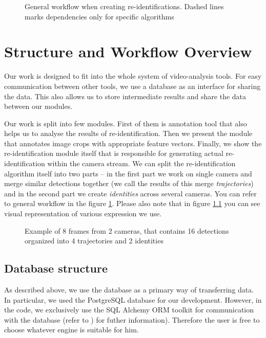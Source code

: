 \begin{figure}
    \centering
    \def\svgwidth{\textwidth}
    
    \caption{General workflow when creating re-identifications. Dashed lines marks
    dependencies only for specific algorithms}
    \label{fig:workflow}
\end{figure}


\chapter{Structure and Workflow Overview}

Our work is designed to fit into the whole system of video-analysis tools. For easy communication
between other tools, we use a database as an interface for sharing the data. This also allows us to
store intermediate results and share the data between our modules.

Our work is split into few modules. First of them is annotation tool that also helps us to analyse the results of re-identification.
Then we present the module that annotates image crops with appropriate feature vectors.
Finally, we show the re-identification module itself that is responsible for generating actual re-identification within the camera stream. We can split the re-identification
algorithm itself into two parts -- in the first part we work on single camera and
merge similar detections together (we call the results of this merge \emph{trajectories})
and in the second part we create \emph{identities} across several cameras. You can
refer to general workflow in the figure \ref{fig:workflow}. Please also note that in
figure \ref{fig:visual_representation} you can see visual representation of various
expression we use.



\begin{figure}
    \centering
    \def\svgwidth{\columnwidth}
    
    \caption{Example of 8 frames from 2 cameras, that contains 16 detections organized into 4 trajectories and 2 identities}
    \label{fig:visual_representation}
\end{figure}


\section{Database structure}

As described above, we use the database as a primary way of transferring data. In particular, we used the PostgreSQL database
for our development. However, in the code, we exclusively use the SQL Alchemy ORM
toolkit for communication with the database (refer to \cite{sqlalchemy}) for futher 
information). Therefore the user is free to choose whatever engine is suitable for him.

